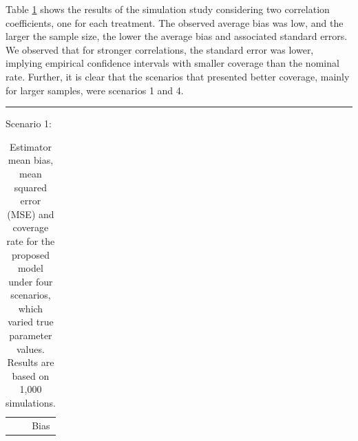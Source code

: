 \documentclass[useAMS,referee]{biom}
\begin{document}
Table \ref{completa} shows the results of the simulation study considering two correlation coefficients, one for each treatment. The observed average bias was low, and the larger the sample size, the lower the average bias and associated standard errors. We observed that for stronger correlations, the standard error was lower, implying empirical confidence intervals with smaller coverage than the nominal rate. Further, it is clear that the scenarios that presented better coverage, mainly for larger samples, were scenarios 1 and 4.



\begin{table}[htb]
\caption{Estimator mean bias, mean squared error (MSE) and coverage rate for the proposed model under four scenarios, which varied true parameter values. Results are based on 1,000 simulations.}\hrule\vspace{0.2cm}
\small
Scenario 1:\\
\begin{minipage}[b]{0.43\textwidth}
\label{completa}
\begin{tabular}{lrrrr} 
	& &   \multicolumn{3}{c}{Bias}  \\ 
	\cmidrule{3-5}
	

\end{tabular}
\end{minipage}
\end{table}
\end{document}
